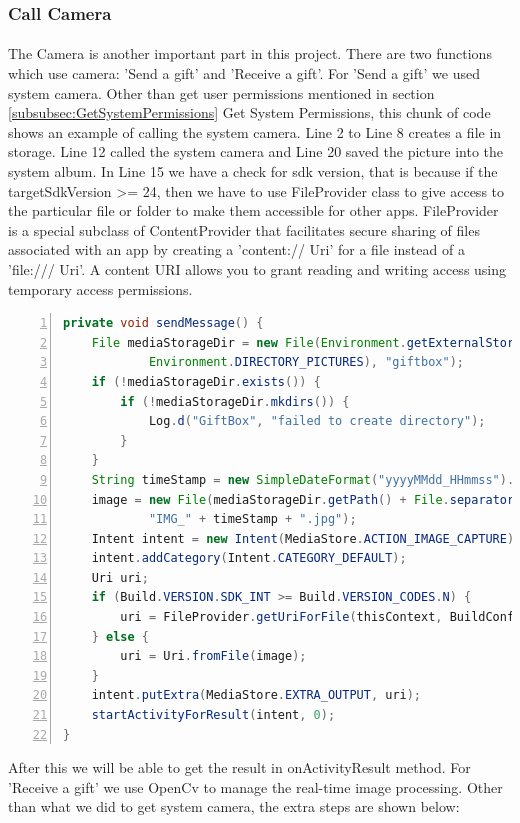\subsubsection{Call Camera}
\label{CallCamera}
\paragraph{} The Camera is another important part in this project. There are two functions which use camera: 'Send a gift' and 'Receive a gift'.
For 'Send a gift' we used system camera. Other than get user permissions mentioned in section \ref{subsubsec:GetSystemPermissions} Get System Permissions, this chunk of code shows an example of calling the system camera. Line 2 to Line 8 creates a file in storage. Line 12 called the system camera and Line 20 saved the picture into the system album. In Line 15 we have a check for sdk version, that is because if the targetSdkVersion >= 24, then we have to use FileProvider class to give access to the particular file or folder to make them accessible for other apps. FileProvider is a special subclass of ContentProvider that facilitates secure sharing of files associated with an app by creating a 'content:// Uri' for a file instead of a 'file:/// Uri'. A content URI allows you to grant reading and writing access using temporary access permissions. 
\begin{lstlisting}[language={java},
        numbers=left,basicstyle=\small\ttfamily,breaklines=true] 
private void sendMessage() {
    File mediaStorageDir = new File(Environment.getExternalStoragePublicDirectory(
            Environment.DIRECTORY_PICTURES), "giftbox");
    if (!mediaStorageDir.exists()) {
        if (!mediaStorageDir.mkdirs()) {
            Log.d("GiftBox", "failed to create directory");
        }
    }
    String timeStamp = new SimpleDateFormat("yyyyMMdd_HHmmss").format(new Date());
    image = new File(mediaStorageDir.getPath() + File.separator +
            "IMG_" + timeStamp + ".jpg");
    Intent intent = new Intent(MediaStore.ACTION_IMAGE_CAPTURE);
    intent.addCategory(Intent.CATEGORY_DEFAULT);
    Uri uri;
    if (Build.VERSION.SDK_INT >= Build.VERSION_CODES.N) {
        uri = FileProvider.getUriForFile(thisContext, BuildConfig.APPLICATION_ID+".fileprovider", image);//BuildConfig.APPLICATION_ID + ".fileProvider"
    } else {
        uri = Uri.fromFile(image);
    }
    intent.putExtra(MediaStore.EXTRA_OUTPUT, uri);
    startActivityForResult(intent, 0);
}
\end{lstlisting} 
\par After this we will be able to get the result in onActivityResult method. For 'Receive a gift' we use OpenCv to manage the real-time image processing. Other than what we did to get system camera, the extra steps are shown below:
